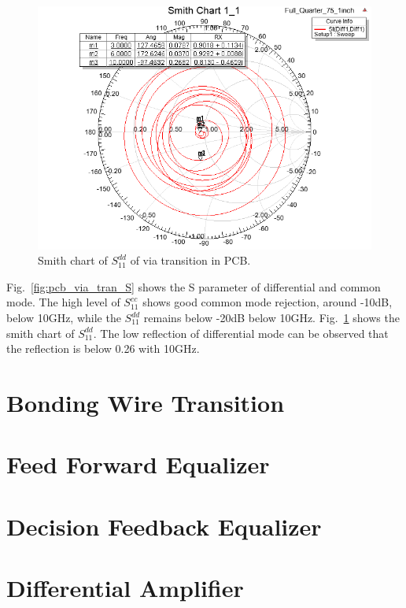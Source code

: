 \documentclass{pj}
\begin{document}
\begin{figure}[htbp!]
	\centering
	\includegraphics[width=0.8\columnwidth]{./img/PCB/Via_Transition/via_transition_smith.png}
	\caption{Smith chart of $S^{dd}_{11}$ of via transition in PCB.}
	\label{fig:pcb_via_tran_Sdd11_smith} %
\end{figure}

Fig.~\ref{fig:pcb_via_tran_S} shows the S parameter of differential and common mode. The high level of $S^{cc}_{11}$ shows good common mode rejection, around -10dB, below 10GHz, while the $S^{dd}_{11}$ remains below -20dB below 10GHz. Fig.~\ref{fig:pcb_via_tran_Sdd11_smith} shows the smith chart of $S^{dd}_{11}$. The low reflection of differential mode can be observed that the reflection is below 0.26 with 10GHz. 


\section{Bonding Wire Transition}
\label{sec:bond_wire}

\section{Feed Forward Equalizer}
\label{sec:FFE}

\section{Decision Feedback Equalizer}
\label{sec:DFE}

\section{Differential Amplifier}
\label{sec:diff_Op}
\end{document}
